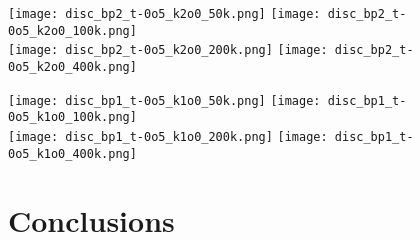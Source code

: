 \documentclass[aps,pre,twocolumn,groupedaddress]{revtex4-1}
\begin{document}
\begin{figure*}[h]
\texttt{[image: disc\_bp2\_t-0o5\_k2o0\_50k.png]}
\texttt{[image: disc\_bp2\_t-0o5\_k2o0\_100k.png]}\\
\texttt{[image: disc\_bp2\_t-0o5\_k2o0\_200k.png]}
\texttt{[image: disc\_bp2\_t-0o5\_k2o0\_400k.png]}
\caption{}
\label{fig1}
\end{figure*}

\begin{figure*}[h]
\texttt{[image: disc\_bp1\_t-0o5\_k1o0\_50k.png]}
\texttt{[image: disc\_bp1\_t-0o5\_k1o0\_100k.png]}\\
\texttt{[image: disc\_bp1\_t-0o5\_k1o0\_200k.png]}
\texttt{[image: disc\_bp1\_t-0o5\_k1o0\_400k.png]}
\caption{}
\label{fig2}
\end{figure*}

\section{Conclusions}


%


\end{document}
